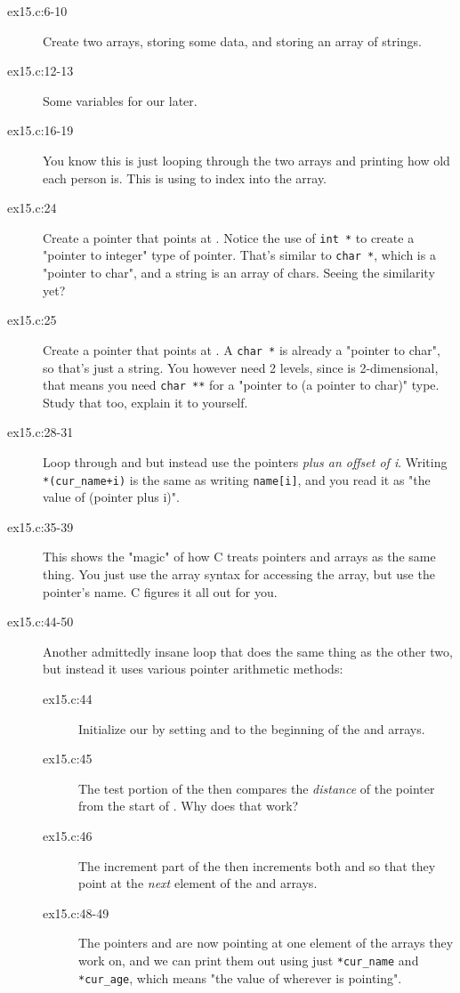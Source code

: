 \begin{description}
\item[ex15.c:6-10] Create two arrays,  storing some 
    data, and  storing an array of strings.
\item[ex15.c:12-13] Some variables for our  later.
\item[ex15.c:16-19] You know this is just looping through the two arrays and
    printing how old each person is.  This is using  to 
    index into the array.
\item[ex15.c:24] Create a pointer that points at .
    Notice the use of \verb|int *| to create a
    "pointer to integer" type of pointer.  That's similar to 
    \verb|char *|, which is a "pointer to char", and a string
    is an array of chars.  Seeing the similarity yet?
\item[ex15.c:25] Create a pointer that points at .
    A \verb|char *| is already a "pointer to char", so that's 
    just a string.  You however need 2 levels, since 
    is 2-dimensional, that means you need \verb|char **| for
    a "pointer to (a pointer to char)" type. Study that too, explain
    it to yourself.
\item[ex15.c:28-31] Loop through  and  but instead
    use the pointers \emph{plus an offset of i}.  Writing
    \verb|*(cur_name+i)| is the same as writing \verb|name[i]|, and
    you read it as "the value of (pointer  plus i)".
\item[ex15.c:35-39] This shows the "magic" of how C treats pointers and
    arrays as the same thing.  You just use the array syntax for
    accessing the array, but use the pointer's name.  C figures it
    all out for you.
\item[ex15.c:44-50] Another admittedly insane loop that does the same thing
    as the other two, but instead it uses various pointer arithmetic
    methods:
    \begin{description}
    \item[ex15.c:44] Initialize our  by setting 
        and  to the beginning of the  and
         arrays.
    \item[ex15.c:45] The test portion of the  then compares
        the \emph{distance} of the pointer  from the
        start of .  Why does that work?
    \item[ex15.c:46] The increment part of the  then increments
        both  and  so that they point
        at the \emph{next} element of the  and 
        arrays.
    \item[ex15.c:48-49] The pointers  and  
        are now pointing at one element of the arrays they work on,
        and we can print them out using just \verb|*cur_name| and
        \verb|*cur_age|, which means "the value of wherever 
            is pointing".
    \end{description}
\end{description}

